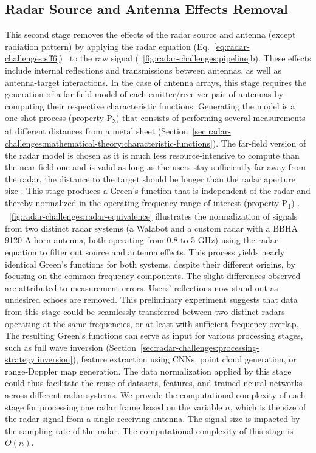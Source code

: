 \subsection{Radar Source and Antenna Effects Removal} \label{sec:radar-challenges:antenna-effects}
This second stage removes the effects of the radar source and antenna (except radiation pattern) by applying the radar equation (Eq.~\ref{eq:radar-challenges:sff6})~\cite{Lambot:2004,Lambot:2014} to the raw signal (\fig~\ref{fig:radar-challenges:pipeline}b). These effects include internal reflections and transmissions between antennas, as well as antenna-target interactions. In the case of antenna arrays, this stage requires the generation of a far-field model of each emitter/receiver pair of antennas by computing their respective characteristic functions. Generating the model is a one-shot process (property P\textsubscript{3}) that consists of performing several measurements at different distances from a metal sheet (Section~\ref{sec:radar-challenges:mathematical-theory:characteristic-functions}). The far-field version of the radar model is chosen as it is much less resource-intensive to compute than the near-field one and is valid as long as the users stay sufficiently far away from the radar, \ie the distance to the target should be longer than the radar aperture size \cite{Tran:2013}. This stage produces a Green's function that is independent of the radar and thereby normalized in the operating frequency range of interest (property P\textsubscript{1}) \cite{DeCoster:2018a}. 
%
\fig~\ref{fig:radar-challenges:radar-equivalence} illustrates the normalization of signals from two distinct radar systems (a Walabot and a custom radar with a BBHA 9120 A horn antenna, both operating from 0.8 to 5 GHz) using the radar equation to filter out source and antenna effects. This process yields nearly identical Green's functions for both systems, despite their different origins, by focusing on the common frequency components. The slight differences observed are attributed to measurement errors. Users' reflections now stand out as undesired echoes are removed. 
%
This preliminary experiment suggests that data from this stage could be seamlessly transferred between two distinct radars operating at the same frequencies, or at least with sufficient frequency overlap. The resulting Green's functions can serve as input for various processing stages, such as full wave inversion (Section~\ref{sec:radar-challenges:processing-strategy:inversion}), feature extraction using CNNs, point cloud generation, or range-Doppler map generation. The data normalization applied by this stage could thus facilitate the reuse of datasets, features, and trained neural networks across different radar systems.
% 
We provide the computational complexity of each stage for processing one radar frame based on the variable $n$, which is the size of the radar signal from a single receiving antenna. The signal size is impacted by the sampling rate of the radar. 
The computational complexity of this stage is $O(n)$.


